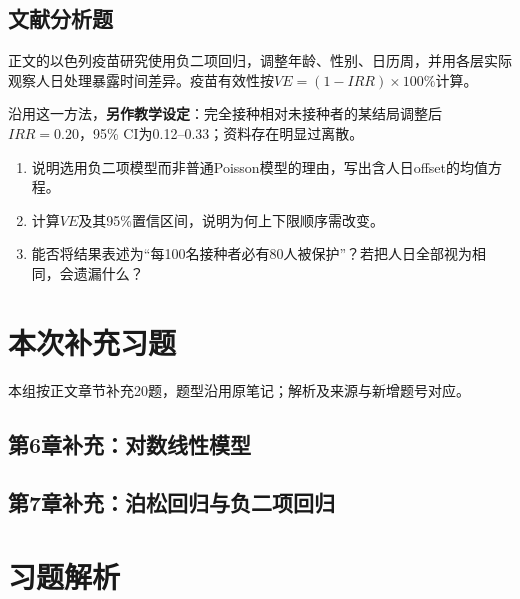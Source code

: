 \par\addvspace{8pt}\noindent\begin{minipage}{\linewidth}

\subsection{文献分析题}


正文的以色列疫苗研究使用负二项回归，调整年龄、性别、日历周，并用各层实际观察人日处理暴露时间差异。疫苗有效性按\(VE=(1-IRR)\times100\%\)计算。

沿用这一方法，\textbf{另作教学设定}：完全接种相对未接种者的某结局调整后\(IRR=0.20\)，95\% CI为0.12--0.33；资料存在明显过离散。
\begin{enumerate}
\item 说明选用负二项模型而非普通Poisson模型的理由，写出含人日offset的均值方程。
\item 计算\(VE\)及其95\%置信区间，说明为何上下限顺序需改变。
\item 能否将结果表述为“每100名接种者必有80人被保护”？若把人日全部视为相同，会遗漏什么？
\end{enumerate}


\end{minipage}\par\vspace{5pt}


\clearpage\section{本次补充习题}
本组按正文章节补充20题，题型沿用原笔记；解析及来源与新增题号对应。
\subsection*{第6章补充：对数线性模型}

\subsection*{第7章补充：泊松回归与负二项回归}


\clearpage\section{习题解析}

